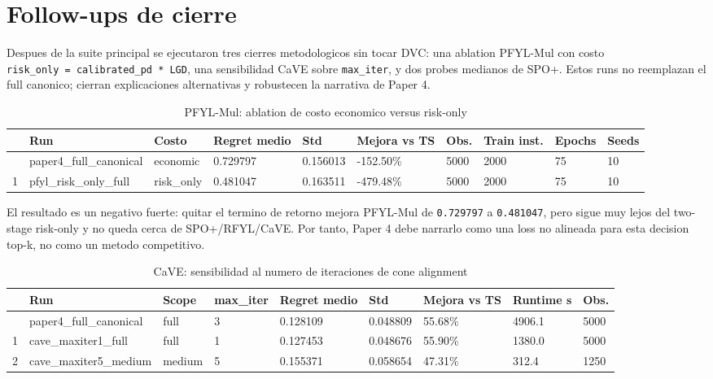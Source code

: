 \documentclass[
  spanish,
  11pt,
  letterpaper,
]{scrbook}
\theoremstyle{plain}
\theoremstyle{remark}
\begin{document}
\section{Follow-ups de cierre}\label{follow-ups-de-cierre}

Despues de la suite principal se ejecutaron tres cierres metodologicos
sin tocar DVC: una ablation PFYL-Mul con costo
\texttt{risk\_only\ =\ calibrated\_pd\ *\ LGD}, una sensibilidad CaVE
sobre \texttt{max\_iter}, y dos probes medianos de SPO+. Estos runs no
reemplazan el full canonico; cierran explicaciones alternativas y
robustecen la narrativa de Paper 4.

{

\begin{longtable}[]{@{}llllllllll@{}}

\caption{\label{tbl-p4-pyepo-pfyl-ablation}PFYL-Mul: ablation de costo
economico versus risk-only}

\tabularnewline

\toprule\noalign{}
& Run & Costo & Regret medio & Std & Mejora vs TS & Obs. & Train inst. &
Epochs & Seeds \\
\midrule\noalign{}
\endhead
\bottomrule\noalign{}
\endlastfoot
0 & paper4\_full\_canonical & economic & 0.729797 & 0.156013 & -152.50\%
& 5000 & 2000 & 75 & 10 \\
1 & pfyl\_risk\_only\_full & risk\_only & 0.481047 & 0.163511 &
-479.48\% & 5000 & 2000 & 75 & 10 \\

\end{longtable}

}

El resultado es un negativo fuerte: quitar el termino de retorno mejora
PFYL-Mul de \texttt{0.729797} a \texttt{0.481047}, pero sigue muy lejos
del two-stage risk-only y no queda cerca de SPO+/RFYL/CaVE. Por tanto,
Paper 4 debe narrarlo como una loss no alineada para esta decision
top-k, no como un metodo competitivo.

{

\begin{longtable}[]{@{}lllllllll@{}}

\caption{\label{tbl-p4-pyepo-cave-sensitivity}CaVE: sensibilidad al
numero de iteraciones de cone alignment}

\tabularnewline

\toprule\noalign{}
& Run & Scope & max\_iter & Regret medio & Std & Mejora vs TS & Runtime
s & Obs. \\
\midrule\noalign{}
\endhead
\bottomrule\noalign{}
\endlastfoot
0 & paper4\_full\_canonical & full & 3 & 0.128109 & 0.048809 & 55.68\% &
4906.1 & 5000 \\
1 & cave\_maxiter1\_full & full & 1 & 0.127453 & 0.048676 & 55.90\% &
1380.0 & 5000 \\
2 & cave\_maxiter5\_medium & medium & 5 & 0.155371 & 0.058654 & 47.31\%
& 312.4 & 1250 \\

\end{longtable}

}
\end{document}
